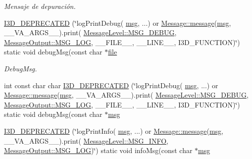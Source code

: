\begin{DoxyCompactItemize}
\begin{DoxyCompactList}\small\item\em Mensaje de depuración. \end{DoxyCompactList}\item 
\hyperlink{class_i3_d_1_1_log_msg_a17cce8fb482ad6bcfc0f3accd5d1a33b}{I3\+D\+\_\+\+D\+E\+P\+R\+E\+C\+A\+T\+ED} (\char`\"{}log\+Print\+Debug( \hyperlink{class_i3_d_1_1_log_msg_a5a1ceb27d9529de8eb9b3fc9377e178a}{msg}, ...) or \hyperlink{class_i3_d_1_1_message_a525f877a41a1e7493188b2b720d1d254}{Message\+::message}(\hyperlink{class_i3_d_1_1_log_msg_a5a1ceb27d9529de8eb9b3fc9377e178a}{msg}, \+\_\+\+\_\+\+V\+A\+\_\+\+A\+R\+G\+S\+\_\+\+\_\+).print( \hyperlink{namespace_i3_d_a1c1740d2076e09b1a37b82e45a0327b5a918e87a1f80863c7ee35bfa2c58cc41e}{Message\+Level\+::\+M\+S\+G\+\_\+\+D\+E\+B\+UG}, \hyperlink{namespace_i3_d_a2ccb65ac6e08844c1175a235107fa103a8c1a4761ebfadb227927517230ff7b02}{Message\+Output\+::\+M\+S\+G\+\_\+\+L\+OG}, \+\_\+\+\_\+\+F\+I\+L\+E\+\_\+\+\_\+, \+\_\+\+\_\+\+L\+I\+N\+E\+\_\+\+\_\+, I3\+D\+\_\+\+F\+U\+N\+C\+T\+I\+ON)\char`\"{}) static void debug\+Msg(const char $\ast$\hyperlink{class_i3_d_1_1_log_msg_ab59f20d39ef112d2196371ae0636d77c}{file}
\begin{DoxyCompactList}\small\item\em Debug\+Msg. \end{DoxyCompactList}\item 
int const char char \hyperlink{class_i3_d_1_1_log_msg_a4bb9bcc06243caa8745dd7e4dda702e0}{I3\+D\+\_\+\+D\+E\+P\+R\+E\+C\+A\+T\+ED} (\char`\"{}log\+Print\+Debug( \hyperlink{class_i3_d_1_1_log_msg_a5a1ceb27d9529de8eb9b3fc9377e178a}{msg}, ...) or \hyperlink{class_i3_d_1_1_message_a525f877a41a1e7493188b2b720d1d254}{Message\+::message}(\hyperlink{class_i3_d_1_1_log_msg_a5a1ceb27d9529de8eb9b3fc9377e178a}{msg}, \+\_\+\+\_\+\+V\+A\+\_\+\+A\+R\+G\+S\+\_\+\+\_\+).print( \hyperlink{namespace_i3_d_a1c1740d2076e09b1a37b82e45a0327b5a918e87a1f80863c7ee35bfa2c58cc41e}{Message\+Level\+::\+M\+S\+G\+\_\+\+D\+E\+B\+UG}, \hyperlink{namespace_i3_d_a2ccb65ac6e08844c1175a235107fa103a8c1a4761ebfadb227927517230ff7b02}{Message\+Output\+::\+M\+S\+G\+\_\+\+L\+OG}, \+\_\+\+\_\+\+F\+I\+L\+E\+\_\+\+\_\+, \+\_\+\+\_\+\+L\+I\+N\+E\+\_\+\+\_\+, I3\+D\+\_\+\+F\+U\+N\+C\+T\+I\+ON)\char`\"{}) static void debug\+Msg(const char $\ast$\hyperlink{class_i3_d_1_1_log_msg_a5a1ceb27d9529de8eb9b3fc9377e178a}{msg}
\item 
\hyperlink{class_i3_d_1_1_log_msg_aeda06127fe9f852a443b55d493132fb1}{I3\+D\+\_\+\+D\+E\+P\+R\+E\+C\+A\+T\+ED} (\char`\"{}log\+Print\+Info( \hyperlink{class_i3_d_1_1_log_msg_a5a1ceb27d9529de8eb9b3fc9377e178a}{msg}, ...) or \hyperlink{class_i3_d_1_1_message_a525f877a41a1e7493188b2b720d1d254}{Message\+::message}(\hyperlink{class_i3_d_1_1_log_msg_a5a1ceb27d9529de8eb9b3fc9377e178a}{msg}, \+\_\+\+\_\+\+V\+A\+\_\+\+A\+R\+G\+S\+\_\+\+\_\+).print( \hyperlink{namespace_i3_d_a1c1740d2076e09b1a37b82e45a0327b5ad5150815f57a5219a42da2f42f90861e}{Message\+Level\+::\+M\+S\+G\+\_\+\+I\+N\+FO}, \hyperlink{namespace_i3_d_a2ccb65ac6e08844c1175a235107fa103a8c1a4761ebfadb227927517230ff7b02}{Message\+Output\+::\+M\+S\+G\+\_\+\+L\+OG})\char`\"{}) static void info\+Msg(const char $\ast$\hyperlink{class_i3_d_1_1_log_msg_a5a1ceb27d9529de8eb9b3fc9377e178a}{msg}

\end{DoxyCompactItemize}
